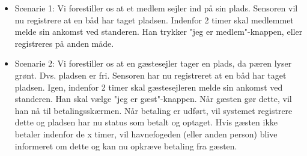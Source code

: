 \begin{itemize}
  \item Scenarie 1: Vi forestiller os at et medlem sejler ind på sin plads. Sensoren vil nu registrere at en båd har taget pladsen. Indenfor 2 timer skal medlemmet melde sin ankomst ved standeren. Han trykker "jeg er medlem"-knappen, eller registreres på anden måde. 
  \item Scenarie 2: Vi forestiller os at en gæstesejler tager en plads, da pæren lyser grønt. Dvs. pladsen er fri. Sensoren har nu registreret at en båd har taget pladsen. Igen, indenfor 2 timer skal gæstesejleren melde sin ankomst ved standeren. Han skal vælge "jeg er gæst"-knappen. Når gæsten gør dette, vil han nå til betalingsskærmen. Når betaling er udført, vil systemet registrere dette og pladsen har nu status som betalt og optaget. Hvis gæsten ikke betaler indenfor de x timer, vil havnefogeden (eller anden person) blive informeret om dette og kan nu opkræve betaling fra gæsten. 
\end{itemize}


